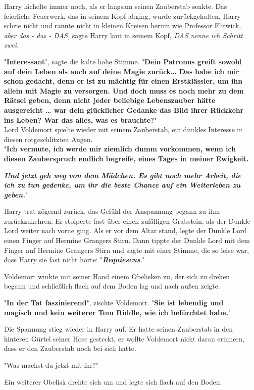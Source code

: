 {Harry lächelte immer noch, als er langsam seinen Zauberstab senkte. Das feierliche Feuerwerk, das in seinem Kopf abging, wurde zurückgehalten, Harry schrie nicht und rannte nicht in kleinen Kreisen herum wie Professor Flitwick, \emph{aber das - das - DAS,} sagte Harry laut in seinem Kopf, \emph{DAS nenne ich Schritt zwei.}

"\textbf{Interessant}", sagte die kalte hohe Stimme. "\textbf{Dein Patronus greift sowohl auf dein Leben als auch auf deine Magie zurück… Das habe ich mir schon gedacht, denn er ist zu mächtig für einen Erstklässler, um ihn allein mit Magie zu versorgen. Und doch muss es noch mehr zu dem Rätsel geben, denn nicht jeder beliebige Lebenszauber hätte ausgereicht … war dein glücklicher Gedanke das Bild ihrer Rückkehr ins Leben? War das alles, was es brauchte?}"\\ Lord Voldemort spielte wieder mit seinem Zauberstab, ein dunkles Interesse in diesen rotgeschlitzten Augen.\\ "\textbf{Ich vermute, ich werde mir ziemlich dumm vorkommen, wenn ich diesen Zauberspruch endlich begreife, eines Tages in meiner Ewigkeit.}

\textbf{\emph{Und jetzt geh weg von dem Mädchen. Es gibt noch mehr Arbeit, die ich zu tun gedenke, um ihr die beste Chance auf ein Weiterleben zu geben.}}"

Harry trat zögernd zurück, das Gefühl der Anspannung begann zu ihm zurückzukehren. Er stolperte fast über einen zufälligen Grabstein, als der Dunkle Lord weiter nach vorne ging. Als er vor dem Altar stand, legte der Dunkle Lord einen Finger auf Hermine Grangers Stirn. Dann tippte der Dunkle Lord mit dem Finger auf Hermine Grangers Stirn und sagte mit einer Stimme, die so leise war, dass Harry sie fast nicht hörte: "\textbf{\emph{Requiescus}}."

Voldemort winkte mit seiner Hand einem Obelisken zu, der sich zu drehen begann und schließlich flach auf dem Boden lag und nach außen zeigte.

"\textbf{In der Tat faszinierend}", zischte Voldemort. "\textbf{Sie ist lebendig und magisch und kein weiterer Tom Riddle, wie ich befürchtet habe.}"

Die Spannung stieg wieder in Harry auf. Er hatte seinen Zauberstab in den hinteren Gürtel seiner Hose gesteckt, er wollte Voldemort nicht daran erinnern, dass er den Zauberstab noch bei sich hatte.

"Was machst du jetzt mit ihr?"

Ein weiterer Obelisk drehte sich um und legte sich flach auf den Boden.

}
